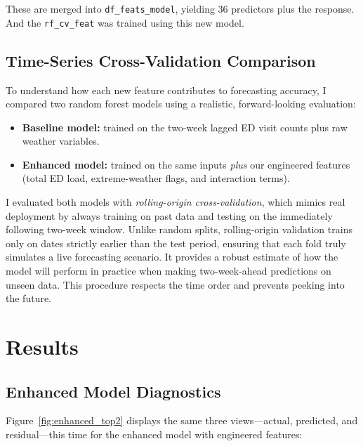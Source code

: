 \documentclass[11pt]{article}
\begin{document}
These are merged into \texttt{df\_feats\_model}, yielding 36 predictors plus the response. And the \texttt{rf\_cv\_feat} was trained using this new model.

\subsection{Time-Series Cross-Validation Comparison}

To understand how each new feature contributes to forecasting accuracy, I compared two random forest models using a realistic, forward-looking evaluation:

\begin{itemize}[nosep]
  \item \textbf{Baseline model:} trained on the two-week lagged ED visit counts plus raw weather variables.
  \item \textbf{Enhanced model:} trained on the same inputs \emph{plus} our engineered features (total ED load, extreme-weather flags, and interaction terms).
\end{itemize}

I evaluated both models with \emph{rolling-origin cross-validation}, which mimics real deployment by always training on past data and testing on the immediately following two-week window. Unlike random splits, rolling-origin validation trains only on dates strictly earlier than the test period, ensuring that each fold truly simulates a live forecasting scenario. It provides a robust estimate of how the model will perform in practice when making two-week-ahead predictions on unseen data. This procedure respects the time order and prevents peeking into the future.



\section{Results}

\subsection{Enhanced Model Diagnostics}

Figure~\ref{fig:enhanced_top2} displays the same three views—actual, predicted, and residual—this time for the enhanced model with engineered features:
\end{document}
